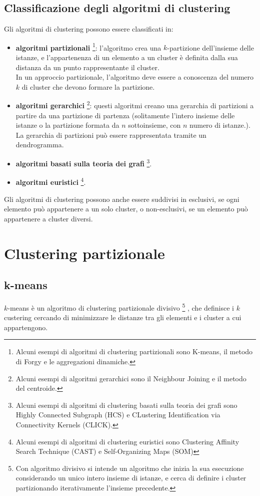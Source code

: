 \subsection{Classificazione degli algoritmi di clustering}
Gli algoritmi di clustering possono essere classificati in:
\begin{itemize}
    \item \textbf{algoritmi partizionali} \footnote{Alcuni esempi di algoritmi
    di clustering partizionali sono K-means, il metodo di Forgy e le
    aggregazioni dinamiche.}: l'algoritmo crea una $k$-partizione dell'insieme
    delle istanze, e l'appartenenza di un elemento a un cluster è definita dalla
    sua distanza da un punto rappresentante il cluster.\\
    In un approccio partizionale, l'algoritmo deve essere a conoscenza del
    numero $k$ di cluster che devono formare la partizione.\\
    \item \textbf{algoritmi gerarchici} \footnote{Alcuni esempi di algoritmi
    gerarchici sono il Neighbour Joining e il metodo del centroide.}: questi
    algoritmi creano una gerarchia di partizioni a partire da una partizione di
    partenza (solitamente l'intero insieme delle istanze o la partizione formata
    da $n$ sottoinsieme, con $n$ numero di istanze.).\\
    La gerarchia di partizioni può essere rappresentata tramite un dendrogramma.
    \item \textbf{algoritmi basati sulla teoria dei grafi} 
            \footnote{Alcuni esempi di algoritmi di clustering basati sulla
            teoria dei grafi sono Highly Connected Subgraph (HCS) e CLustering
            Identification via Connectivity Kernels (CLICK).}.
    \item \textbf{algoritmi euristici}
            \footnote{Alcuni esempi di algoritmi di clustering euristici sono
            Clustering Affinity Search Technique (CAST) e Self-Organizing Maps
            (SOM)}.
\end{itemize}
Gli algoritmi di clustering possono anche essere suddivisi in esclusivi, se ogni
elemen\-to può appartenere a un solo cluster, o non-esclusivi, se un elemento
può appartenere a cluster diversi.


\section{Clustering partizionale}
\subsection{k-means}
$k$-means è un algoritmo di clustering partizionale divisivo 
            \footnote{Con algoritmo divisivo si intende un algoritmo che inizia
            la sua esecuzione considerando un unico intero insieme di istanze, e
            cerca di definire i cluster partizionando iterativamente l'insieme
            precedente.}
, che definisce i $k$ custering cercando di minimizzare le distanze tra gli
elementi e i cluster a cui appartengono.

